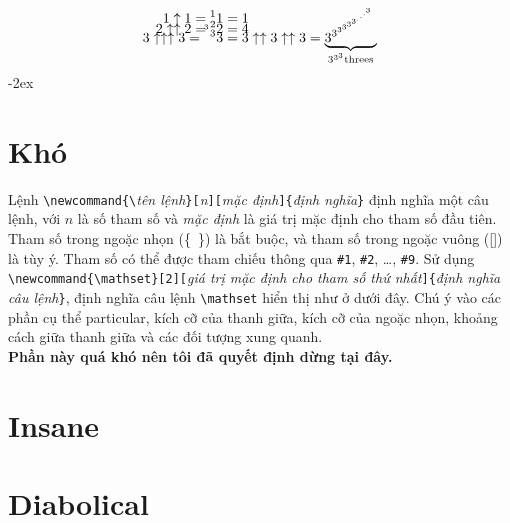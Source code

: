 \documentclass[a4paper,12pt,notitlepage]{article}
\newcommand{\mathset}[2][]{ %
	\ifthenelse{\isempty{#1}}%
	{
	\mathopen{}\left\{\begin{array}{c} %
		#2
	\end{array}\right\}\mathclose{}
	}
	{
	\mathopen{}\left\{\begin{array}{c V{1.25} c} %
		#1 & #2
	\end{array}\right\}\mathclose{}
	}
}
\begin{document}
	\begin{align}
		1 \uparrow 1 = {^1}1 &= 1 \nonumber \\[-2ex]
		2 \uparrow \uparrow 2 = {^2}2 &= 4 \nonumber \\[-2ex]
		3 \uparrow \uparrow \uparrow 3 = \smash{{^{^{^3}3}}3} %
		&= 3 \uparrow \uparrow 3 \uparrow \uparrow 3 = \underbrace{\smash{3^{3^{3^{3^{3^{3^{.^{.^{.^{3}}}}}}}}}}}_{3^{3^3} \text{threes}}
	\end{align}
	\newpage
	\openup -2ex
	\section{Khó}
	Lệnh \verb+\newcommand{\+\textit{tên lệnh}\verb+}[+\textit{n}\verb+][+\textit{mặc định}\verb+]{+\textit{định nghĩa}\verb+}+ định nghĩa một câu lệnh, với $n$ là
	số tham số và \textit{mặc định} là giá trị mặc định cho tham số đầu tiên.
	Tham số trong ngoặc nhọn \mbox{(\{ {} \})} là bắt buộc, và tham số trong ngoặc vuông ([\phantom{a}]) là tùy ý. 
	Tham số có thể được tham chiếu thông qua \verb|#1|, \verb|#2|, \ldots , \verb|#9|. 
	Sử dụng \verb+\newcommand{\mathset}[2][+\textit{giá trị mặc định cho tham số thứ nhất}\verb+]{+\textit{định nghĩa câu lệnh}\verb+}+, định nghĩa câu lệnh \verb+\mathset+ hiển thị như ở dưới đây. 
	Chú ý vào các phần cụ thể particular, kích cỡ của thanh giữa, kích cỡ của ngoặc nhọn, khoảng cách giữa thanh giữa và các đối tượng xung quanh. \\
	\textbf{Phần này quá khó nên tôi đã quyết định dừng tại đây.}
	\section{Insane}
	\section{Diabolical}
\end{document}
